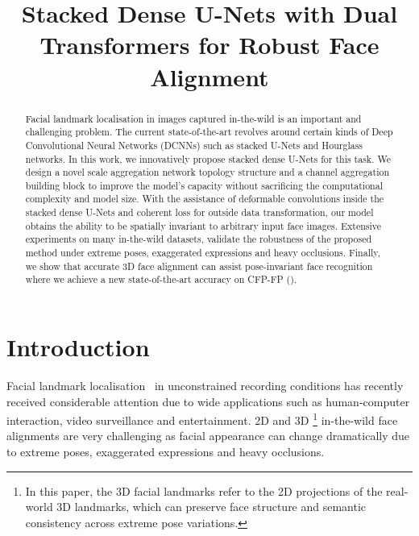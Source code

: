 \documentclass{bmvc2k}
\title{Stacked Dense U-Nets with Dual Transformers for Robust Face Alignment}
\begin{document}
\maketitle

\begin{abstract} 
Facial landmark localisation in images captured in-the-wild is an important and challenging problem. The current state-of-the-art revolves around certain kinds of Deep Convolutional Neural Networks (DCNNs) such as stacked U-Nets and Hourglass networks. In this work, we innovatively propose stacked dense U-Nets for this task. We design a novel scale aggregation network topology structure and a channel aggregation building block to improve the model's capacity without sacrificing the computational complexity and model size. With the assistance of deformable convolutions inside the stacked dense U-Nets and coherent loss for outside data transformation, our model obtains the ability to be spatially invariant to arbitrary input face images. Extensive experiments on many in-the-wild datasets, validate the robustness of the proposed method under extreme poses, exaggerated expressions and heavy occlusions. Finally, we show that accurate 3D face alignment can assist pose-invariant face recognition where we achieve a new state-of-the-art accuracy on CFP-FP ().
\end{abstract}

\section{Introduction}

Facial landmark localisation~\cite{sagonas2016300,stefanos2017menpo,stefanos20173Dmenpo,deng2016m,yang2015facial,yang2017stacked,liu2017adaptive,liu2016dual,deng2017joint} in unconstrained recording conditions has recently received considerable attention due to wide applications such as human-computer interaction, video surveillance and entertainment. 2D and 3D \footnote{In this paper, the 3D facial landmarks refer to the 2D projections of the real-world 3D landmarks, which can preserve face structure and semantic consistency across extreme pose variations.} in-the-wild face alignments are very challenging as facial appearance can change dramatically due to extreme poses, exaggerated expressions and heavy occlusions.
\end{document}
